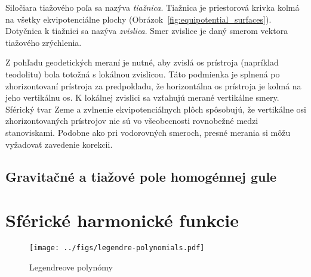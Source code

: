 \documentclass[a4paper, 12pt]{book}
\begin{document}
Siločiara tiažového poľa sa nazýva \emph{tiažnica}.  Tiažnica je priestorová 
krivka kolmá na všetky ekvipotenciálne plochy 
(Obrázok~\ref{fig:equipotential_surfaces}).  Dotyčnica k tiažnici sa nazýva 
\emph{zvislica}.  Smer zvislice je daný smerom vektora tiažového zrýchlenia.

Z pohľadu geodetických meraní je nutné, aby zvislá os prístroja (napríklad 
teodolitu) bola totožná s lokálnou zvislicou.  Táto podmienka je splnená po 
zhorizontovaní prístroja za predpokladu, že horizontálna os prístroja je kolmá 
na jeho vertikálnu os.  K lokálnej zvislici sa vzťahujú merané vertikálne 
smery.  Sférický tvar Zeme a zvlnenie ekvipotenciálnych plôch spôsobujú, že 
vertikálne osi zhorizontovaných prístrojov nie sú vo všeobecnosti rovnobežné 
medzi stanoviskami.  Podobne ako pri vodorovných smeroch, presné merania si 
môžu vyžadovať zavedenie korekcii.






\section{Gravitačné a tiažové pole homogénnej gule}






\chapter{Sférické harmonické funkcie}
\label{sec:spherical_harmonics}




\begin{figure}[bt]
\centering
\texttt{[image: ../figs/legendre-polynomials.pdf]}
\caption{Legendreove polynómy}
\end{figure}



\end{document}
